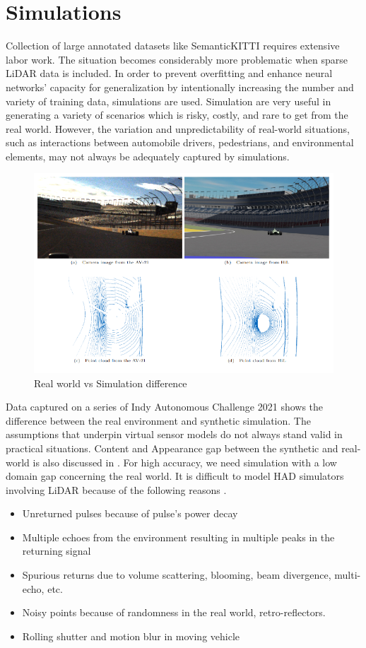 \section{Simulations}
Collection of large annotated datasets like SemanticKITTI requires extensive labor work\parencite{behley2019semantickitti}. The situation becomes considerably more problematic when sparse LiDAR data is included. In order to prevent overfitting and enhance neural networks' capacity for generalization by intentionally increasing the number and variety of training data, simulations are used. Simulation are very useful in generating a variety of scenarios which is risky, costly, and rare to get from the real world. However, the variation and unpredictability of real-world situations, such as interactions between automobile drivers, pedestrians, and environmental elements, may not always be adequately captured by simulations.
\begin{figure}[htbp]
    \centering
    \includegraphics[width=0.8\linewidth]{97_graphics/related_work/real_vs_simulation_difference.pdf}
    \caption{Real world vs Simulation difference \parencite{sauerbeck_learn_Year}}
    \label{fig:related_work-real_vs_simulation}
\end{figure}

Data captured on a series of Indy Autonomous Challenge 2021 \parencite{sauerbeck_learn_Year} shows the difference between the real environment and synthetic simulation. The assumptions that underpin virtual sensor models do not always stand valid in practical situations. Content and Appearance gap between the synthetic and real-world is also discussed in \parencite{care_real_and_syn_gap}. For high accuracy, we need simulation with a low domain gap concerning the real world. It is difficult to model HAD simulators involving LiDAR because of the following reasons \parencite{zero_domain_gap}. 
\begin{itemize}
    \item Unreturned pulses because of pulse's power decay
    \item Multiple echoes from the environment resulting in multiple peaks in the returning signal
    \item Spurious returns due to volume scattering, blooming, beam divergence, multi-echo, etc.
    \item Noisy points because of randomness in the real world, retro-reflectors.
    \item Rolling shutter and motion blur in moving vehicle
\end{itemize}

